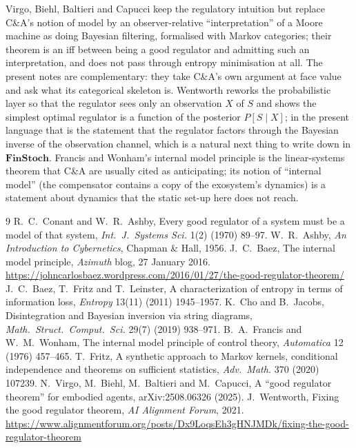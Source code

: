 \documentclass[11pt,a4paper]{article}
\theoremstyle{definition}
\theoremstyle{remark}
\newcommand{\FinStoch}{\mathbf{FinStoch}}
\begin{document}
Virgo, Biehl, Baltieri and Capucci \cite{Virgo2025} keep the regulatory
intuition but replace C\&A's notion of model by an observer-relative
``interpretation'' of a Moore machine as doing Bayesian filtering, formalised
with Markov categories; their theorem is an iff between being a good regulator
and admitting such an interpretation, and does not pass through entropy
minimisation at all. The present notes are complementary: they take C\&A's own
argument at face value and ask what its categorical skeleton is. Wentworth
\cite{Wentworth2021} reworks the probabilistic layer so that the regulator sees
only an observation $X$ of $S$ and shows the simplest optimal regulator is a
function of the posterior $P[S\mid X]$; in the present language that is the
statement that the regulator factors through the Bayesian inverse of the
observation channel, which is a natural next thing to write down in
$\FinStoch$. Francis and Wonham's internal model principle
\cite{FrancisWonham1976} is the linear-systems theorem that C\&A are usually
cited as anticipating; its notion of ``internal model'' (the compensator
contains a copy of the exosystem's dynamics) is a statement about dynamics
that the static set-up here does not reach.

\begin{thebibliography}{9}
 R.~C.~Conant and W.~R.~Ashby, Every good regulator of a system must be a model of that system, \emph{Int.\ J.\ Systems Sci.} 1(2) (1970) 89--97.
 W.~R.~Ashby, \emph{An Introduction to Cybernetics}, Chapman \& Hall, 1956.
 J.~C.~Baez, The internal model principle, \emph{Azimuth} blog, 27 January 2016. \url{https://johncarlosbaez.wordpress.com/2016/01/27/the-good-regulator-theorem/}
 J.~C.~Baez, T.~Fritz and T.~Leinster, A characterization of entropy in terms of information loss, \emph{Entropy} 13(11) (2011) 1945--1957.
 K.~Cho and B.~Jacobs, Disintegration and Bayesian inversion via string diagrams, \emph{Math.\ Struct.\ Comput.\ Sci.} 29(7) (2019) 938--971.
 B.~A.~Francis and W.~M.~Wonham, The internal model principle of control theory, \emph{Automatica} 12 (1976) 457--465.
 T.~Fritz, A synthetic approach to Markov kernels, conditional independence and theorems on sufficient statistics, \emph{Adv.\ Math.} 370 (2020) 107239.
 N.~Virgo, M.~Biehl, M.~Baltieri and M.~Capucci, A ``good regulator theorem'' for embodied agents, arXiv:2508.06326 (2025).
 J.~Wentworth, Fixing the good regulator theorem, \emph{AI Alignment Forum}, 2021. \url{https://www.alignmentforum.org/posts/Dx9LoqsEh3gHNJMDk/fixing-the-good-regulator-theorem}
\end{thebibliography}
\end{document}
